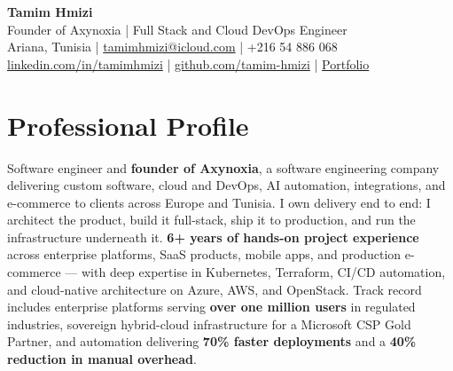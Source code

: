 \documentclass[10pt, letterpaper]{article}
\begin{document}
{\fontsize{24}{24}\selectfont \textbf{\color{accent}Tamim Hmizi}} \\[4pt]
{\large Founder of Axynoxia \;|\; Full Stack and Cloud DevOps Engineer} \\[6pt]
Ariana, Tunisia \;|\;
\href{mailto:tamimhmizi@icloud.com}{tamimhmizi@icloud.com} \;|\;
+216 54 886 068 \\
\href{https://linkedin.com/in/tamimhmizi}{linkedin.com/in/tamimhmizi} \;|\;
\href{https://github.com/tamim-hmizi}{github.com/tamim-hmizi} \;|\;
\href{https://tamim-hmizi.github.io/Portfolio/}{Portfolio}

\vspace{0.4cm}

\section{Professional Profile}
Software engineer and \textbf{founder of Axynoxia}, a software engineering company delivering custom software, cloud and DevOps, AI automation, integrations, and e-commerce to clients across Europe and Tunisia.
I own delivery end to end: I architect the product, build it full-stack, ship it to production, and run the infrastructure underneath it.
\textbf{6+ years of hands-on project experience} across enterprise platforms, SaaS products, mobile apps, and production e-commerce --- with deep expertise in Kubernetes, Terraform, CI/CD automation, and cloud-native architecture on Azure, AWS, and OpenStack.
Track record includes enterprise platforms serving \textbf{over one million users} in regulated industries, sovereign hybrid-cloud infrastructure for a Microsoft CSP Gold Partner, and automation delivering \textbf{70\% faster deployments} and a \textbf{40\% reduction in manual overhead}.

\end{document}

